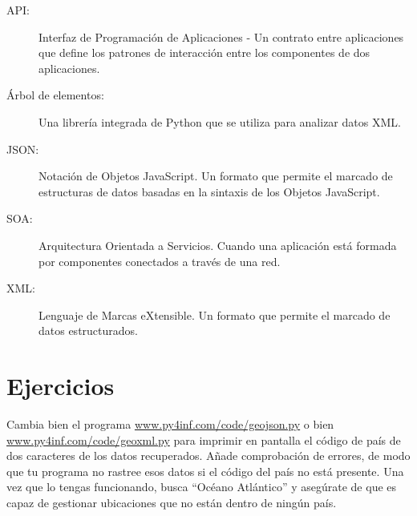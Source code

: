 \begin{description}

\item[API:] Interfaz de Programación de Aplicaciones - Un contrato entre
aplicaciones que define los patrones de interacción entre
los componentes de dos aplicaciones.

\item[Árbol de elementos:] Una librería integrada de Python que se utiliza
para analizar datos XML.

\item[JSON:] Notación de Objetos JavaScript. Un formato que permite
el marcado de estructuras de datos basadas en la sintaxis de los Objetos
JavaScript.

\item[SOA:] Arquitectura Orientada a Servicios. Cuando una aplicación
está formada por componentes conectados a través de una red.

\item[XML:] Lenguaje de Marcas eXtensible. Un formato que permite
el marcado de datos estructurados.

\end{description}

\section{Ejercicios}

\begin{ex}
Cambia bien el programa
\url{www.py4inf.com/code/geojson.py} o bien
\url{www.py4inf.com/code/geoxml.py} para imprimir en pantalla el
código de país de dos caracteres de los datos recuperados.
Añade comprobación de errores, de modo que tu programa no rastree esos datos
si el código del país no está presente. Una vez que lo tengas
funcionando, busca ``Océano Atlántico'' y asegúrate
de que es capaz de gestionar ubicaciones que no están dentro de ningún país.
\end{ex}
